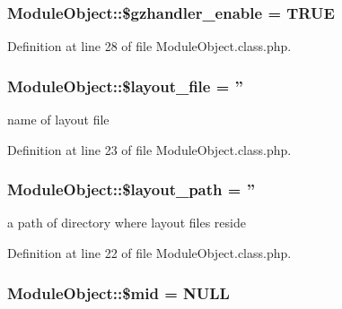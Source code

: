 \hypertarget{classModuleObject_acda88247a161a0ddf878e8f504909329}{
\subsubsection[{\$gzhandler\+\_\+enable}]{\setlength{\rightskip}{0pt plus 5cm}Module\+Object\+::\$gzhandler\+\_\+enable = T\+R\+U\+E}}\label{classModuleObject_acda88247a161a0ddf878e8f504909329}


Definition at line 28 of file Module\+Object.\+class.\+php.

\hypertarget{classModuleObject_a2a1677b06eb7b3ff04ff19e960a64e08}{
\subsubsection[{\$layout\+\_\+file}]{\setlength{\rightskip}{0pt plus 5cm}Module\+Object\+::\$layout\+\_\+file = ''}}\label{classModuleObject_a2a1677b06eb7b3ff04ff19e960a64e08}


name of layout file 



Definition at line 23 of file Module\+Object.\+class.\+php.

\hypertarget{classModuleObject_ada660958e777413d332337fba67d657f}{
\subsubsection[{\$layout\+\_\+path}]{\setlength{\rightskip}{0pt plus 5cm}Module\+Object\+::\$layout\+\_\+path = ''}}\label{classModuleObject_ada660958e777413d332337fba67d657f}


a path of directory where layout files reside 



Definition at line 22 of file Module\+Object.\+class.\+php.

\hypertarget{classModuleObject_abb68807f12d0fde6c9ea78a1a820d250}{
\subsubsection[{\$mid}]{\setlength{\rightskip}{0pt plus 5cm}Module\+Object\+::\$mid = N\+U\+L\+L}}\label{classModuleObject_abb68807f12d0fde6c9ea78a1a820d250}


